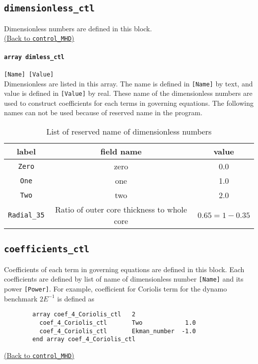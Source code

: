 \subsection{\tt dimensionless\_ctl}
\label{href_t:dimensionless_ctl}
Dimensionless numbers are defined in this block. \\
\hyperref[href_i:dimensionless_ctl]{(Back to {\tt control\_MHD})}

\paragraph{\tt array dimless\_ctl}
\label{href_t:dimless_ctl}
\verb|[Name] [Value]| \\
Dimensionless are listed in this array. The name is defined in \verb|[Name]| by text, and value is defined in \verb|[Value]| by real. These name of the dimensionless numbers are used to construct coefficients for each terms in governing equations. The following names can not be used because of reserved name in the program.
%
\begin{table}[htp]
\caption{List of reserved name of dimensionless numbers}
\begin{center}
\begin{tabular}{|c|c|c|}
\hline
 label & field name & value \\ \hline
\verb|Zero| & zero & 0.0 \\
\verb|One| &  one &  1.0 \\
\verb|Two| &  two &  2.0 \\
\verb|Radial_35| & Ratio of outer core thickness to whole core & $0.65 = 1 - 0.35$ \\ \hline
\end{tabular}
\end{center}
\label{table:reserved_params}
\end{table}
%

\subsection{\tt coefficients\_ctl}
\label{href_t:coefficients_ctl}
Coefficients of each term in governing equations are defined in this block.
Each coefficients are defined by list of name of dimensionless number \verb|[Name]| and its power \verb|[Power]|. For example, coefficient for Coriolis term for the dynamo benchmark $ 2E^{-1}$ is defined as
%
\begin{verbatim}
        array coef_4_Coriolis_ctl   2
          coef_4_Coriolis_ctl       Two            1.0
          coef_4_Coriolis_ctl       Ekman_number  -1.0
        end array coef_4_Coriolis_ctl
\end{verbatim}
%
\hyperref[href_i:coefficients_ctl]{(Back to {\tt control\_MHD})}

